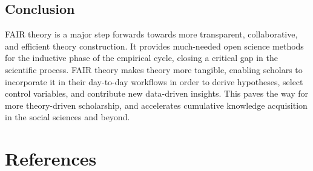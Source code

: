 \documentclass[
  man,floatsintext]{apa6}
\begin{document}
\subsection{Conclusion}\label{conclusion}

FAIR theory is a major step forwards towards more transparent, collaborative, and efficient theory construction.
It provides much-needed open science methods for the inductive phase of the empirical cycle,
closing a critical gap in the scientific process.
FAIR theory makes theory more tangible, enabling scholars to incorporate it in their day-to-day workflows in order to derive hypotheses, select control variables, and contribute new data-driven insights.
This paves the way for more theory-driven scholarship,
and accelerates cumulative knowledge acquisition in the social sciences and beyond.

\newpage

\section{References}\label{references}
\end{document}
